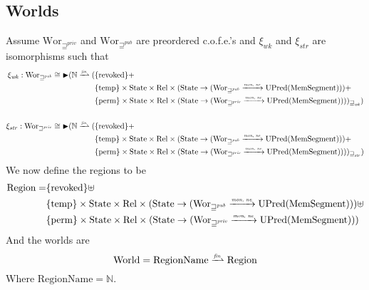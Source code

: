 \documentclass[a4paper]{article}
\newcommand{\finparfun}{\xrightharpoonup{\textit{\tiny{fin}}}}
\newcommand{\monnefun}{\xrightarrow{\textit{\tiny{mon, ne}}}}
\newcommand{\fun}{\rightarrow}
\newcommand{\blater}{\mathop{\blacktriangleright}}
\newcommand{\cofe}{c.o.f.e.}
\newcommand{\cofes}{\cofe{}'s}
\newcommand{\var}[1]{\mathit{#1}}
\newcommand{\future}{\mathbin{\sqsupseteq}}
\newcommand{\futurewk}{\mathbin{\sqsupseteq}^{\var{pub}}}
\newcommand{\futurestr}{\mathbin{\sqsupseteq}^{\var{priv}}}
\newcommand{\plaindom}[1]{\mathrm{#1}}
\newcommand{\HeapSegments}{\plaindom{MemSegment}}
\newcommand{\nats}{\mathbb{N}}
\newcommand{\Rel}{\plaindom{Rel}}
\newcommand{\States}{\plaindom{State}}
\newcommand{\RegionNames}{\plaindom{RegionName}}
\newcommand{\Regions}{\plaindom{Region}}
\newcommand{\Worlds}{\plaindom{World}}
\newcommand{\Wor}{\plaindom{Wor}}
\newcommand{\Worwk}{\Wor_{\futurewk}}
\newcommand{\Worstr}{\Wor_{\futurestr}}
\newcommand{\UPred}[1]{\plaindom{UPred}(#1)}
\newcommand{\plainview}[1]{\mathrm{#1}}
\newcommand{\perma}{\plainview{perm}}
\newcommand{\temp}{\plainview{temp}}
\newcommand{\revoked}{\plainview{revoked}}
\begin{document}
\begin{lemma}
\subsection{Worlds}
Assume $\Worstr$ and $\Worwk$ are preordered \cofes{} and $\xi_{\var{wk}}$ and $\xi_{\var{str}}$ are isomorphisms such that
\begin{align*}
  \xi_{\var{wk}} :   \Worwk \cong \blater (\nats \finparfun (   & \{\revoked\} + \\
                                                                & \{\temp\} \times \States \times \Rel \times (\States \fun (\Worwk \monnefun \UPred{\HeapSegments})) + \\
                                                                & \{\perma\} \times \States \times \Rel \times (\States \fun (\Worstr \monnefun \UPred{\HeapSegments})))_{\future_{\var{wk}}}) \\ \\
  \xi_{\var{str}} :   \Worstr \cong \blater (\nats \finparfun ( & \{\revoked\} + \\
                                                                & \{\temp\} \times \States \times \Rel \times (\States \fun (\Worwk \monnefun \UPred{\HeapSegments})) + \\
                                                                & \{\perma\} \times \States \times \Rel \times (\States \fun (\Worstr \monnefun \UPred{\HeapSegments})))_{\future_{\var{str}}})
\end{align*}
We now define the regions to be
\begin{align*}
  \Regions = & \{\revoked\} \uplus \\
             & \{\temp\} \times \States \times \Rel \times (\States \fun (\Worwk \monnefun \UPred{\HeapSegments})) \uplus \\
             & \{\perma\} \times \States \times \Rel \times (\States \fun (\Worstr \monnefun \UPred{\HeapSegments}))
\end{align*}
And the worlds are
\[
  \Worlds = \RegionNames \finparfun \Regions
\]
Where $\RegionNames = \nats$.


\end{lemma}
\end{document}
